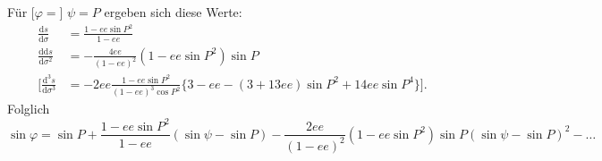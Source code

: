 \noindent Für [\(\varphi=\)] \(\psi=P\) ergeben sich diese Werte:
\[
\begin{aligned}
\frac{\mathrm ds}{\mathrm d\sigma}
&=\frac{1-ee\sin P^2}{1-ee}\\
\frac{\mathrm{dd}s}{\mathrm d\sigma^2}
&=-\frac{4ee}{(1-ee)^2}(1-ee\sin P^2)\sin P\\
\mathopen{\Big[}\frac{\mathrm d^3s}{\mathrm d\sigma^3}
&=-2ee\frac{1-ee\sin P^2}{(1-ee)^3\cos P^2}
\{3-ee-(3+13ee)\sin P^2+14ee\sin P^4\}\Big].
\end{aligned}
\]
\noindent Folglich
\[
\sin\varphi=\sin P+\frac{1-ee\sin P^2}{1-ee}(\sin\psi-\sin P)
-\frac{2ee}{(1-ee)^2}(1-ee\sin P^2)\sin P(\sin\psi-\sin P)^2-\ldots
\]

\par\clearpage
\noindent\makebox[12mm][l]{}\par\medskip


